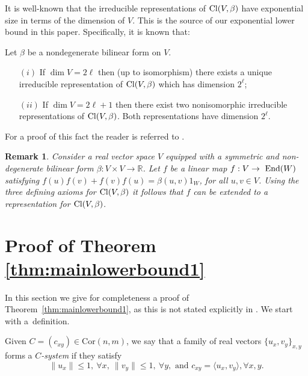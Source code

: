 \documentclass{siamart}
\newtheorem{remark}{Remark}[section]
\begin{document}
It is well-known that the irreducible representations of ${\rm Cl}(V,\beta)$ have exponential size in terms of the dimension of $V$. This  is the source of {our exponential lower bound} in this paper.  Specifically, it is known that:

\medskip
\begin{theorem}\label{thm:cliffrepresentations}
Let $\beta$ be a nondegenerate bilinear form on $V$.
\begin{itemize}
\item[$(i)$] If  $\dim V=2\ell $ then  (up to isomorphism) there exists a unique irreducible representation of ${\rm Cl}(V,\beta)$ {which} has dimension $2^\ell$;
\item[$(ii)$] If  $\dim V=2\ell +1$ then there exist two {nonisomorphic} irreducible representations of ${\rm Cl}(V,\beta)$. Both representations have dimension $2^\ell$.
\end{itemize}
\end{theorem}
\medskip

For a proof of this fact the reader is referred to \cite[Theorem 6.1.3]{GW}.

\medskip
\begin{remark}\label{rem:cscdd}Consider a  real vector space $V$ equipped with a   symmetric and non-degenerate  bilinear form $\beta: V\times V\rightarrow {\mathbb{R}}$.  Let $f$ be a linear map $f: V\rightarrow~{\rm End}(W)$ satisfying $f(u)f(v)+f(v)f(u)=\beta(u,v)1_W$, for all $u,v\in V$.
Using the three defining axioms for  ${\rm Cl}(V,\beta)$ it follows that $f$ can be extended to a representation for ${\rm Cl}(V,\beta)$.
\end{remark}

\section{Proof of Theorem \ref{thm:mainlowerbound1}}
\label{sec:dsvefwefwe}

In this section we give for completeness  a proof of Theorem~\ref{thm:mainlowerbound1}, as this is not stated explicitly in \cite{TS87}.  We start with a~definition.

\medskip
\begin{definition} Given $ C =(c_{xy}) \in {\mathrm{Cor}(n,m)}$, we say that a family of  real vectors $\{u_x, v_y\}_{x,y}$ forms  a {\em $C$-system} if they satisfy
\[ \|u_x\|\le 1,\  \forall x,\  \|v_y\|\le 1,\ \forall y, \text{ and } c_{xy}={\langle} u_x,v_y{\rangle}, \forall x,y. \]
\end{definition}
\medskip
\end{document}
